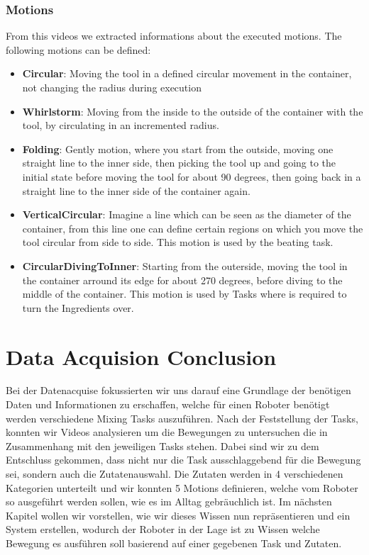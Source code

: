 \subsubsection*{Motions}
	From this videos we extracted informations about the executed motions. The following motions can be defined:
	\begin{itemize}
		\item \textbf{Circular}: Moving the tool in a defined circular movement in the container, not changing the radius during execution
		\item \textbf{Whirlstorm}: Moving from the inside to the outside of the container with the tool, by circulating in an incremented radius.
		\item \textbf{Folding}: Gently motion, where you start from the outside, moving one straight line to the inner side, then picking the tool up and going to the initial state before moving the tool for about 90 degrees, then going back in a straight line to the inner side of the container again.
		\item \textbf{VerticalCircular}: Imagine a line which can be seen as the diameter of the container, from this line one can define certain regions on which you move the tool circular from side to side. This motion is used by the beating task.
		\item \textbf{CircularDivingToInner}: Starting from the outerside, moving the tool in the container arround its edge for about 270 degrees, before diving to the middle of the container. This motion is used by Tasks where is required to turn the Ingredients over.
	\end{itemize}

\section*{Data Acquision Conclusion}

Bei der Datenacquise fokussierten wir uns darauf eine Grundlage der benötigen Daten und Informationen zu erschaffen, welche für einen Roboter benötigt werden verschiedene Mixing Tasks auszuführen.
Nach der Feststellung der Tasks, konnten wir Videos analysieren um die Bewegungen zu untersuchen die in Zusammenhang mit den jeweiligen Tasks stehen. Dabei sind wir zu dem Entschluss gekommen, dass nicht nur die Task ausschlaggebend für die Bewegung sei, sondern auch die Zutatenauswahl.
Die Zutaten werden in 4 verschiedenen Kategorien unterteilt und wir konnten 5 Motions definieren, welche vom Roboter so ausgeführt werden sollen, wie es im Alltag gebräuchlich ist.
Im nächsten Kapitel wollen wir vorstellen, wie wir dieses Wissen nun repräsentieren und ein System erstellen, wodurch der Roboter in der Lage ist zu Wissen welche Bewegung es ausführen soll basierend auf einer gegebenen Task und Zutaten.
\newpage
